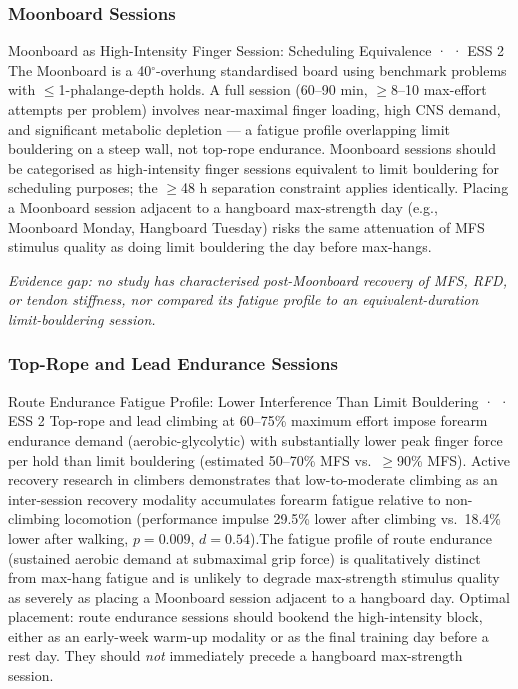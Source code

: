 \subsubsection*{Moonboard Sessions}

\begin{bioplausbox}{Moonboard as High-Intensity Finger Session: Scheduling Equivalence · \bioplausible · ESS 2}
The Moonboard is a 40$^\circ$-overhung standardised board using benchmark problems with $\leq$1-phalange-depth holds. A full session (60–90 min, $\geq$8–10 max-effort attempts per problem) involves near-maximal finger loading, high CNS demand, and significant metabolic depletion — a fatigue profile overlapping limit bouldering on a steep wall, not top-rope endurance. Moonboard sessions should be categorised as high-intensity finger sessions equivalent to limit bouldering for scheduling purposes; the $\geq$48 h separation constraint applies identically. Placing a Moonboard session adjacent to a hangboard max-strength day (e.g., Moonboard Monday, Hangboard Tuesday) risks the same attenuation of MFS stimulus quality as doing limit bouldering the day before max-hangs.

\textit{Evidence gap: no study has characterised post-Moonboard recovery of MFS, RFD, or tendon stiffness, nor compared its fatigue profile to an equivalent-duration limit-bouldering session.}\singlesource
\end{bioplausbox}

\subsubsection*{Top-Rope and Lead Endurance Sessions}

\begin{bioplausbox}{Route Endurance Fatigue Profile: Lower Interference Than Limit Bouldering · \bioplausible · ESS 2}
Top-rope and lead climbing at 60–75\% maximum effort impose forearm endurance demand (aerobic-glycolytic) with substantially lower peak finger force per hold than limit bouldering (estimated 50–70\% MFS vs.\ $\geq$90\% MFS). Active recovery research in climbers demonstrates that low-to-moderate climbing as an inter-session recovery modality accumulates forearm fatigue relative to non-climbing locomotion (performance impulse 29.5\% lower after climbing vs.\ 18.4\% lower after walking, $p = 0.009$, $d = 0.54$).\singlesource The fatigue profile of route endurance (sustained aerobic demand at submaximal grip force) is qualitatively distinct from max-hang fatigue and is unlikely to degrade max-strength stimulus quality as severely as placing a Moonboard session adjacent to a hangboard day. Optimal placement: route endurance sessions should bookend the high-intensity block, either as an early-week warm-up modality or as the final training day before a rest day. They should \emph{not} immediately precede a hangboard max-strength session.
\end{bioplausbox}

